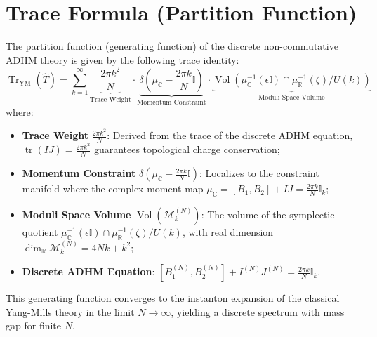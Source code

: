 \documentclass[12pt,a4paper]{amsart}
\theoremstyle{plain}
\theoremstyle{definition}
\theoremstyle{remark}
\DeclareMathOperator{\tr}{tr}
\DeclareMathOperator{\Tr}{Tr}
\DeclareMathOperator{\Vol}{Vol}
\begin{document}
\section{Trace Formula (Partition Function)}\label{app:trace}

The partition function (generating function) of the discrete non-commutative ADHM theory is given by the following trace identity:
\begin{equation}
\Tr_{\mathrm{YM}}(\hat{T}) = \sum_{k=1}^{\infty} \underbrace{\frac{2\pi k^2}{N}}_{\text{Trace Weight}} \cdot \underbrace{\delta\left(\mu_{\mathbb{C}} - \frac{2\pi k}{N}\mathbb{I}\right)}_{\text{Momentum Constraint}} \cdot \underbrace{\Vol\left(\mu_{\mathbb{C}}^{-1}(\epsilon\mathbb{I}) \cap \mu_{\mathbb{R}}^{-1}(\zeta)/U(k)\right)}_{\text{Moduli Space Volume}}
\end{equation}
where:
\begin{itemize}
\item \textbf{Trace Weight} $\displaystyle \frac{2\pi k^2}{N}$: Derived from the trace of the discrete ADHM equation, $\tr(IJ) = \frac{2\pi k^2}{N}$ guarantees topological charge conservation;
\item \textbf{Momentum Constraint} $\displaystyle \delta\left(\mu_{\mathbb{C}} - \frac{2\pi k}{N}\mathbb{I}\right)$: Localizes to the constraint manifold where the complex moment map $\mu_{\mathbb{C}} = [B_1,B_2]+IJ = \frac{2\pi k}{N}\mathbb{I}_k$;
\item \textbf{Moduli Space Volume} $\displaystyle \Vol\left(\mathcal{M}_k^{(N)}\right)$: The volume of the symplectic quotient $\mu_{\mathbb{C}}^{-1}(\epsilon\mathbb{I}) \cap \mu_{\mathbb{R}}^{-1}(\zeta)/U(k)$, with real dimension $\dim_{\mathbb{R}}\mathcal{M}_k^{(N)} = 4Nk + k^2$;
\item \textbf{Discrete ADHM Equation}: $[B_1^{(N)}, B_2^{(N)}] + I^{(N)}J^{(N)} = \frac{2\pi k}{N}\mathbb{I}_k$.
\end{itemize}
This generating function converges to the instanton expansion of the classical Yang-Mills theory in the limit $N\to\infty$, yielding a discrete spectrum with mass gap for finite $N$.
\end{document}
